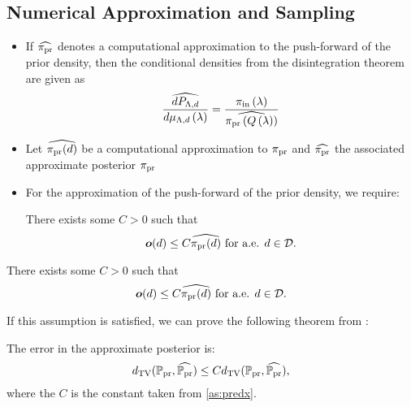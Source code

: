 \subsection{Numerical Approximation and Sampling}
\begin{frame}[t]
\begin{itemize}
	\item If $\widehat{\operatorname*{\pi_{pr}}}$ denotes a computational approximation to the push-forward of the prior density, then the conditional densities from the disintegration theorem are given as
\[
\frac{\widehat{dP_{{\Lambda}, d}}}{d\mu_{{\Lambda}, d}\left ( \lambda \right )} = \frac{\operatorname*{\pi_{in}}\left ( \lambda \right )}{ \widehat{\operatorname*{\pi_{pr}}\left ( Q\left ( \lambda \right ) \right )} }
\]
	\item Let $\widehat{\operatorname*{\pi_{pr}}(d)}$ be a computational approximation to $\operatorname*{\pi_{pr}}$ and $\widehat{\operatorname*{\pi_{pr}}}$ the associated approximate posterior $\operatorname*{\pi_{pr}}$
	\item For the approximation of the push-forward of the prior density, we require:
\begin{assumption}\label{as:predx}
There exists some $C>0$ such that
\[
\operatorname*{\boldsymbol{o}} (d) \leq C \widehat{\operatorname*{\pi_{pr}}(d)} \text{ for a.e. } d\in \mathcal{D}.
\]
\end{assumption}

\end{itemize}

\end{frame}


\begin{frame}[t]
\begin{assumption}\label{as:predx}
There exists some $C>0$ such that
\[
\operatorname*{\boldsymbol{o}} (d) \leq C \widehat{\operatorname*{\pi_{pr}}(d)} \text{ for a.e. } d\in \mathcal{D}.
\]
\end{assumption}

If this assumption is satisfied, we can prove the following theorem from \cite{BJW18}:

\begin{theorem}
The error in the approximate posterior is:
\begin{equation}\label{eq:pfpr_bound}
d_{\text{TV}} (\operatorname*{\mathbb{P}_{pr}}, \widehat{\operatorname*{\mathbb{P}_{pr}}}) \leq C d_{\text{TV}} (\operatorname*{\mathbb{P}_{pr}}, \widehat{\operatorname*{\mathbb{P}_{pr}}}),
\end{equation}
where the $C$ is the constant taken from \eqref{as:predx}.
\end{theorem}

\end{frame}


